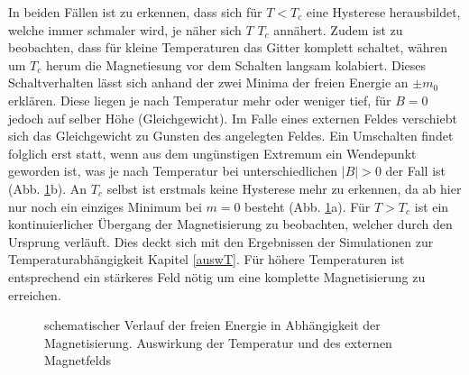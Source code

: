 In beiden Fällen ist zu erkennen, dass sich für $T<T_{c}$ eine Hysterese herausbildet, welche immer schmaler wird, je näher sich $T$ $T_{c}$ annähert. Zudem ist zu beobachten, dass für kleine Temperaturen das Gitter komplett schaltet, währen um $T_{c}$ herum die Magnetiesung vor dem Schalten langsam kolabiert. Dieses Schaltverhalten lässt sich anhand der zwei Minima der freien Energie an $\pm m_{0}$ erklären. Diese liegen je nach Temperatur mehr oder weniger tief, für $B=0$ jedoch auf selber Höhe (Gleichgewicht). Im Falle eines externen Feldes verschiebt sich das Gleichgewicht zu Gunsten des angelegten Feldes. Ein Umschalten findet folglich erst statt, wenn aus dem ungünstigen Extremum ein Wendepunkt geworden ist, was je nach Temperatur bei unterschiedlichen $|B|>0$ der Fall ist (Abb. \ref{fmag}b). An $T_{c}$ selbst ist erstmals keine Hysterese mehr zu erkennen, da ab hier nur noch ein einziges Minimum bei $m=0$ besteht (Abb. \ref{fmag}a). Für $T>T_{c}$ ist ein kontinuierlicher Übergang der Magnetisierung zu beobachten, welcher durch den Ursprung verläuft. Dies deckt sich mit den Ergebnissen der Simulationen zur Temperaturabhängigkeit Kapitel \ref{auswT}. Für höhere Temperaturen ist entsprechend ein stärkeres Feld nötig um eine komplette Magnetisierung zu erreichen. 
\begin{figure}[H]
	\centering
	\caption{schematischer Verlauf der freien Energie in Abhängigkeit der Magnetisierung. Auswirkung der Temperatur und des externen Magnetfelds}
	\label{fmag}
\end{figure}

